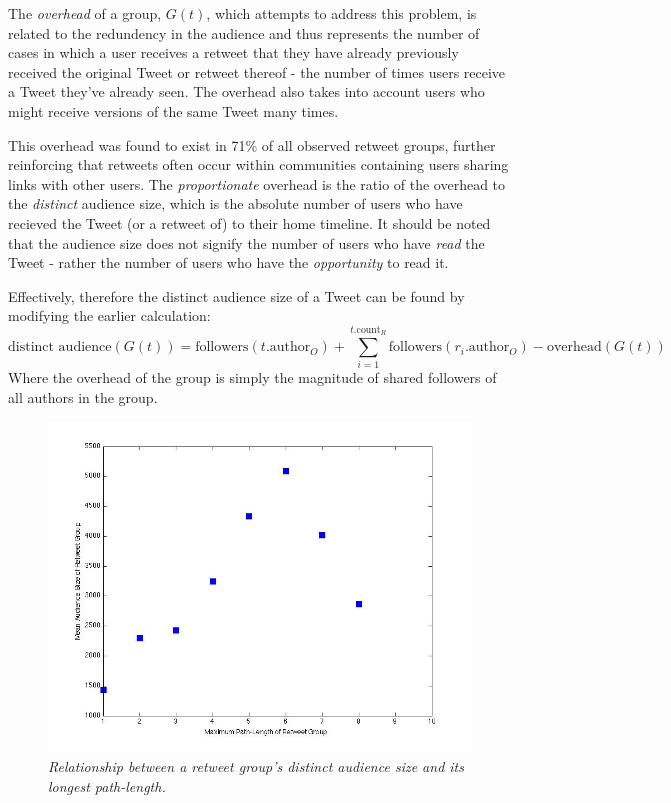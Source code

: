 The \textit{overhead} of a group, $G(t)$, which attempts to address this problem, is related to the redundency in the audience and thus represents the number of cases in which a user receives a retweet that they have already previously received the original Tweet or retweet thereof - the number of times users receive a Tweet they've already seen. The overhead also takes into account users who might receive versions of the same Tweet many times.

This overhead was found to exist in 71\% of all observed retweet groups, further reinforcing that retweets often occur within communities containing users sharing links with other users. The \textit{proportionate} overhead is the ratio of the overhead to the \textit{distinct} audience size, which is the absolute number of users who have recieved the Tweet (or a retweet of) to their home timeline. It should be noted that the audience size does not signify the number of users who have \textit{read} the Tweet - rather the number of users who have the \textit{opportunity} to read it.

Effectively, therefore the distinct audience size of a Tweet can be found by modifying the earlier calculation:
\[
	\textrm{distinct audience}(G(t)) = \textrm{followers}(t.\textrm{author}_O) + \sum\limits_{i=1}^{t.\mathrm{count}_R} \textrm{followers}(r_i.\textrm{author}_O) - \textrm{overhead}(G(t))
\]
Where the overhead of the group is simply the magnitude of shared followers of all authors in the group.

\begin{figure}[h]
\centering
\includegraphics[scale=0.35]{3.Chapter1/Media/audience-pathlength.jpg} 
\caption{\textit{Relationship between a retweet group's distinct audience size and its longest path-length.}}
\label{fig:pathlength-audience}
\end{figure}

